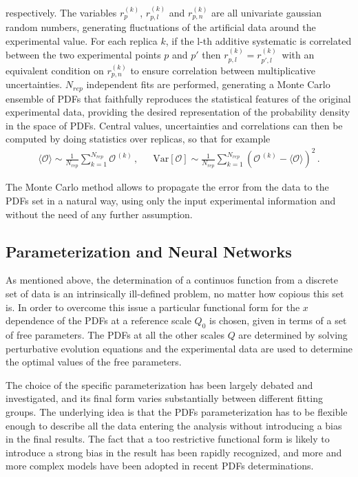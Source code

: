respectively. The variables $r_{p}^{(k)}$, $r_{p,l}^{(k)}$ and $r_{p,n}^{(k)}$
are all univariate gaussian random numbers, generating fluctuations of the artificial data around the experimental value.
For each replica $k$, if the l-th additive systematic is correlated between the two experimental points $p$ and $p'$
then $r_{p,l}^{(k)} = r_{p',l}^{(k)}\,$ with an equivalent condition on $r_{p,n}^{(k)}$ to ensure correlation between multiplicative
uncertainties. 
$N_{rep}$ independent fits are performed, generating a Monte Carlo ensemble of
PDFs that faithfully reproduces the statistical features of the original experimental 
data, providing the desired representation of the probability density in the space of PDFs.
Central values, uncertainties and correlations can then be computed by doing statistics over
replicas, so that for example
\begin{align}
    \label{eq:expectation_value_observable_mc}
    \langle \mathcal{O}\rangle \sim \frac{1}{N_{rep}}\sum_{k=1}^{N_{rep}}
    \mathcal{O}^{\,(k)}\,,\,\,\,\,\,\,\,\,\,
    \text{Var}\left[\mathcal{O}\right] \sim 
    \frac{1}{N_{rep}}\sum_{k=1}^{N_{rep}}\left(\mathcal{O}^{\,(k)} - \langle\mathcal{O}\rangle\right)^2\,.
\end{align}

The Monte Carlo method allows to propagate the error from the data to the PDFs set
in a natural way, using only the input experimental information and without the need of any further assumption.

\subsection{Parameterization and Neural Networks}
As mentioned above, the determination of a continuos function from a discrete set of data 
is an intrinsically ill-defined problem, no matter how copious this set is. In order to overcome this
issue a particular functional form for the $x$ dependence of the PDFs at a reference scale $Q_0$ is chosen,
given in terms of a set of free parameters.
The PDFs at all the other scales $Q$ are determined by solving perturbative evolution equations 
and the experimental data are used to determine the optimal values of the free parameters.

%
The choice of the specific parameterization has been largely debated and investigated,
and its final form varies substantially between different fitting groups.
The underlying idea is that the PDFs parameterization has to be flexible enough to describe all the data
entering the analysis without introducing a bias in the final results.
The fact that a too restrictive functional form is likely to introduce a strong bias in the result
has been rapidly recognized, and more and more complex models have been adopted in recent PDFs determinations.

